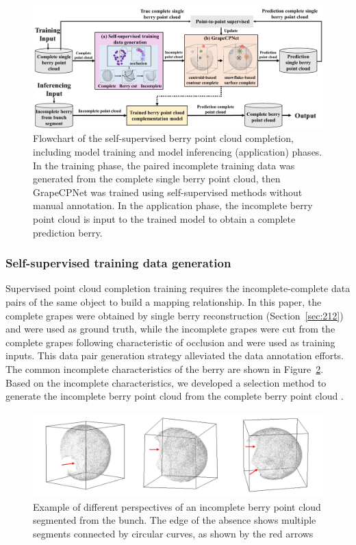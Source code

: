 \documentclass[12pt]{article}
\begin{document}
\begin{figure}[hbt!]
    \centering
    \includegraphics[width=1\textwidth]{figures/Figure7.pdf}
    \caption{Flowchart of the self-supervised berry point cloud completion, including model training and model inferencing (application) phases. In the training phase, the paired incomplete training data was generated from the complete single berry point cloud, then GrapeCPNet was trained using self-supervised methods without manual annotation. In the application phase, the incomplete berry point cloud is input to the trained model to obtain a complete prediction berry.}
    \label{fig:raw3}
\end{figure}

\subsubsection{Self-supervised training data generation}
\label{sec:berrycut}

Supervised point cloud completion training requires the incomplete-complete data pairs of the same object to build a mapping relationship. 
In this paper, the complete grapes were obtained by single berry reconstruction (Section~\ref{sec:212}) and were used as ground truth, while the incomplete grapes were cut from the complete grapes following characteristic of occlusion and were used as training inputs. 
This data pair generation strategy alleviated the data annotation efforts. The common incomplete characteristics of the berry are shown in Figure~\ref{fig:raw4}.
Based on the incomplete characteristics, we developed a selection method to generate the incomplete berry point cloud from the complete berry point cloud .

\begin{figure}[hbt!]
    \centering
    \includegraphics[width=1\textwidth]{figures/Figure8.pdf}
    \caption{Example of different perspectives of an incomplete berry point cloud segmented from the bunch. The edge of the absence shows multiple segments connected by circular curves, as shown by the red arrows}
    \label{fig:raw4}
\end{figure}
\end{document}
